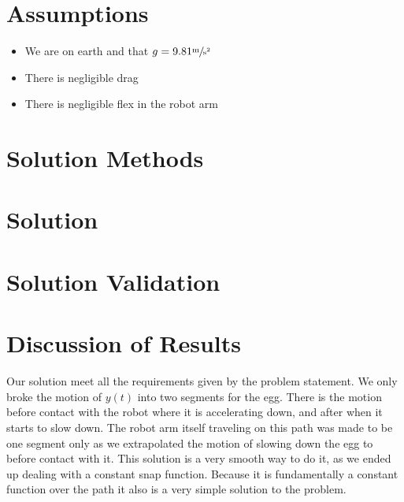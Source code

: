 \documentclass[nofoot,pdf-a,balance,upint,subscriptcorrection,varvw]{asmeconf}
\begin{document}
		\section*{Assumptions}
	
	\begin{itemize}
        \item We are on earth and that $g = 9.81 \sfrac{\textrm{m}}{\textrm{s}^2}$
		\item There is negligible drag
		\item There is negligible flex in the robot arm
	\end{itemize}

	\section*{Solution Methods}
	
	\section*{Solution}
	
	\section*{Solution Validation}
	
	\section*{Discussion of Results}
	
	Our solution meet all the requirements given by the problem statement. We only broke the motion of $y\left(t\right)$ into two segments for the egg. There is the motion before contact with the robot where it is accelerating down, and after when it starts to slow down. The robot arm itself traveling on this path was made to be one segment only as we extrapolated the motion of slowing down the egg to before contact with it. This solution is a very smooth way to do it, as we ended up dealing with a constant snap function. Because it is fundamentally a constant function over the path it also is a very simple solution to the problem.
	
\end{document}
